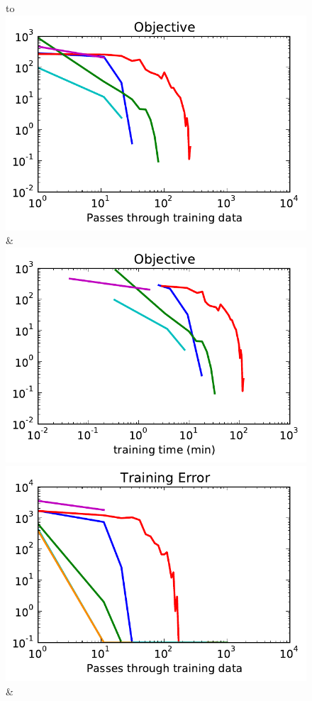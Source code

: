 \begin{figure}
    \begin{tabu} to 
    \\[-3mm]
    \includegraphics[width=\linewidth]{evaluation/images/snakes_ad3}&%
    \includegraphics[width=\linewidth]{evaluation/images/snakes_ad3_time}\\
    \includegraphics[width=\linewidth]{evaluation/images/snakes_ad3_loss}&%

\end{tabu}
\end{figure}
